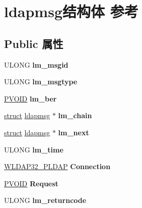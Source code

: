 \hypertarget{structldapmsg}{}\section{ldapmsg结构体 参考}
\label{structldapmsg}
\subsection*{Public 属性}
\begin{DoxyCompactItemize}
\item 
\mbox{\label{structldapmsg_a81703f10f0bbfbe36e80ae6cfafd3361}} 
U\+L\+O\+NG {\bfseries lm\+\_\+msgid}
\item 
\mbox{\label{structldapmsg_ab771805574485a37dcf94bd637da09ec}} 
U\+L\+O\+NG {\bfseries lm\+\_\+msgtype}
\item 
\mbox{\label{structldapmsg_affd01eafcb599663114745480d5d6ab0}} 
\hyperlink{interfacevoid}{P\+V\+O\+ID} {\bfseries lm\+\_\+ber}
\item 
\mbox{\label{structldapmsg_a3f9966c3686fbd35fd953e9433a875ef}} 
\hyperlink{interfacestruct}{struct} \hyperlink{structldapmsg}{ldapmsg} $\ast$ {\bfseries lm\+\_\+chain}
\item 
\mbox{\label{structldapmsg_a6a085945767b510432307a2b539c0075}} 
\hyperlink{interfacestruct}{struct} \hyperlink{structldapmsg}{ldapmsg} $\ast$ {\bfseries lm\+\_\+next}
\item 
\mbox{\label{structldapmsg_a89f296f6f26b068e58aea8d3b0184cdf}} 
U\+L\+O\+NG {\bfseries lm\+\_\+time}
\item 
\mbox{\label{structldapmsg_a727f9d21f045f0e69cd8764529183802}} 
\hyperlink{structldap}{W\+L\+D\+A\+P32\+\_\+\+P\+L\+D\+AP} {\bfseries Connection}
\item 
\mbox{\label{structldapmsg_aa0333fe68bffbe71e2c826e9739d18d1}} 
\hyperlink{interfacevoid}{P\+V\+O\+ID} {\bfseries Request}
\item 
\mbox{\label{structldapmsg_a41467fd916862bd68fce3cfdb713bd32}} 
U\+L\+O\+NG {\bfseries lm\+\_\+returncode}

\end{DoxyCompactItemize}
